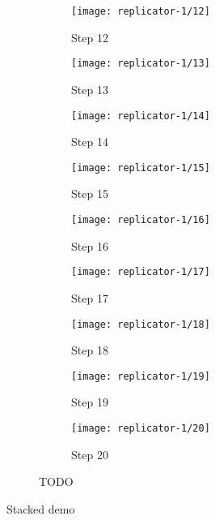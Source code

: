 \begin{figure}[!ht]
    \ContinuedFloat
    \centering
    \begin{subfigure}{0.32\textwidth}
        \centering
        \texttt{[image: replicator-1/12]}
        \caption{Step 12}
    \end{subfigure}
    \begin{subfigure}{0.32\textwidth}
        \centering
        \texttt{[image: replicator-1/13]}
        \caption{Step 13}
    \end{subfigure}
    \begin{subfigure}{0.32\textwidth}
        \centering
        \texttt{[image: replicator-1/14]}
        \caption{Step 14}
    \end{subfigure}
    \par\bigskip
    \begin{subfigure}{0.32\textwidth}
        \centering
        \texttt{[image: replicator-1/15]}
        \caption{Step 15}
    \end{subfigure}
    \begin{subfigure}{0.32\textwidth}
        \centering
        \texttt{[image: replicator-1/16]}
        \caption{Step 16}
    \end{subfigure}
    \begin{subfigure}{0.32\textwidth}
        \centering
        \texttt{[image: replicator-1/17]}
        \caption{Step 17}
    \end{subfigure}
    \par\bigskip
    \begin{subfigure}{0.32\textwidth}
        \centering
        \texttt{[image: replicator-1/18]}
        \caption{Step 18}
    \end{subfigure}
    \begin{subfigure}{0.32\textwidth}
        \centering
        \texttt{[image: replicator-1/19]}
        \caption{Step 19}
    \end{subfigure}
    \begin{subfigure}{0.32\textwidth}
        \centering
        \texttt{[image: replicator-1/20]}
        \caption{Step 20}
    \end{subfigure}
    \caption[Replicator 1] {
        TODO
    }
    \label{fig:replicator-1}
\end{figure}

\TODO
Stacked demo
